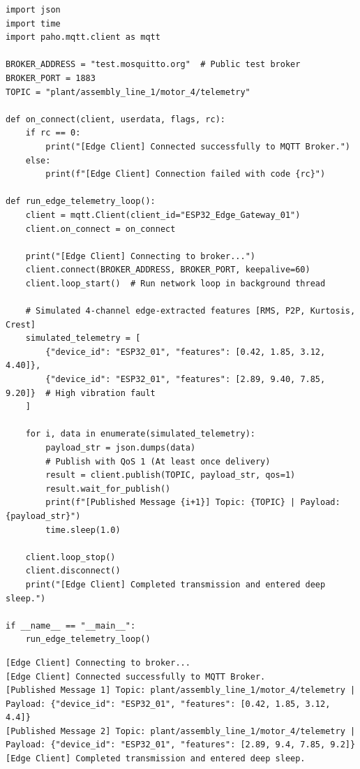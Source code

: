 \begin{lstlisting}[style=pythonstyle, caption={Edge telemetry client using Paho-MQTT to stream features.}, label={lst:mqtt_client}]
import json
import time
import paho.mqtt.client as mqtt

BROKER_ADDRESS = "test.mosquitto.org"  # Public test broker
BROKER_PORT = 1883
TOPIC = "plant/assembly_line_1/motor_4/telemetry"

def on_connect(client, userdata, flags, rc):
    if rc == 0:
        print("[Edge Client] Connected successfully to MQTT Broker.")
    else:
        print(f"[Edge Client] Connection failed with code {rc}")

def run_edge_telemetry_loop():
    client = mqtt.Client(client_id="ESP32_Edge_Gateway_01")
    client.on_connect = on_connect
    
    print("[Edge Client] Connecting to broker...")
    client.connect(BROKER_ADDRESS, BROKER_PORT, keepalive=60)
    client.loop_start()  # Run network loop in background thread
    
    # Simulated 4-channel edge-extracted features [RMS, P2P, Kurtosis, Crest]
    simulated_telemetry = [
        {"device_id": "ESP32_01", "features": [0.42, 1.85, 3.12, 4.40]},
        {"device_id": "ESP32_01", "features": [2.89, 9.40, 7.85, 9.20]}  # High vibration fault
    ]
    
    for i, data in enumerate(simulated_telemetry):
        payload_str = json.dumps(data)
        # Publish with QoS 1 (At least once delivery)
        result = client.publish(TOPIC, payload_str, qos=1)
        result.wait_for_publish()
        print(f"[Published Message {i+1}] Topic: {TOPIC} | Payload: {payload_str}")
        time.sleep(1.0)
        
    client.loop_stop()
    client.disconnect()
    print("[Edge Client] Completed transmission and entered deep sleep.")

if __name__ == "__main__":
    run_edge_telemetry_loop()
\end{lstlisting}

\begin{lstlisting}[style=outputstyle, caption={Output of the edge MQTT telemetry publisher.}]
[Edge Client] Connecting to broker...
[Edge Client] Connected successfully to MQTT Broker.
[Published Message 1] Topic: plant/assembly_line_1/motor_4/telemetry | Payload: {"device_id": "ESP32_01", "features": [0.42, 1.85, 3.12, 4.4]}
[Published Message 2] Topic: plant/assembly_line_1/motor_4/telemetry | Payload: {"device_id": "ESP32_01", "features": [2.89, 9.4, 7.85, 9.2]}
[Edge Client] Completed transmission and entered deep sleep.
\end{lstlisting}

